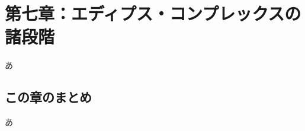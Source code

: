 \section{第七章：エディプス・コンプレックスの諸段階}\label{ux7b2cux4e03ux7ae0ux30a8ux30c7ux30a3ux30d7ux30b9ux30b3ux30f3ux30d7ux30ecux30c3ux30afux30b9ux306eux8af8ux6bb5ux968e}

あ

\subsection{この章のまとめ}\label{ux3053ux306eux7ae0ux306eux307eux3068ux3081}

あ
